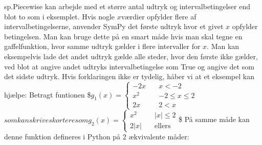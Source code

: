 \documentclass[letterpaper,10pt,english]{jupyterBook}
\begin{document}
\noindent{}

sp.Piecewise kan arbejde med et større antal udtryk og intervalbetingelser end blot to som i eksemplet. Hvis nogle \(x\)\sphinxhyphen{}værdier opfylder flere af intervalbetingelserne, anvender SymPy det første udtryk hvor et givet \(x\) opfylder betingelsen. Man kan bruge dette på en smart måde hvis man skal tegne en gaffelfunktion, hvor samme udtryk gælder i flere intervaller for \(x\). Man kan eksempelvis lade det andet udtryk gælde alle steder, hvor den første ikke gælder, ved blot at angive andet udtryks intervalbetingelse som True og angive det som det sidste udtryk. Hvis forklaringen ikke er tydelig, håber vi at et eksempel kan hjælpe: Betragt funtionen
\$\(g_1(x) = \begin{cases} -2x \quad &x < -2 \\ x^2 \quad &-2\leq x\leq 2\\ 2x \quad &2 < x\quad \end{cases}\)\(
som kan skrives kortere som 
\)\(g_2(x) = \begin{cases} x^2 \quad &|x|\leq 2\\ 2|x| \quad &\mbox{ellers}\end{cases}\)\$
På samme måde kan denne funktion defineres i Python på 2 ækvivalente måder:

\begin{sphinxVerbatim}[commandchars=\\\{\}]
        
         

          
\end{sphinxVerbatim}
\end{document}
